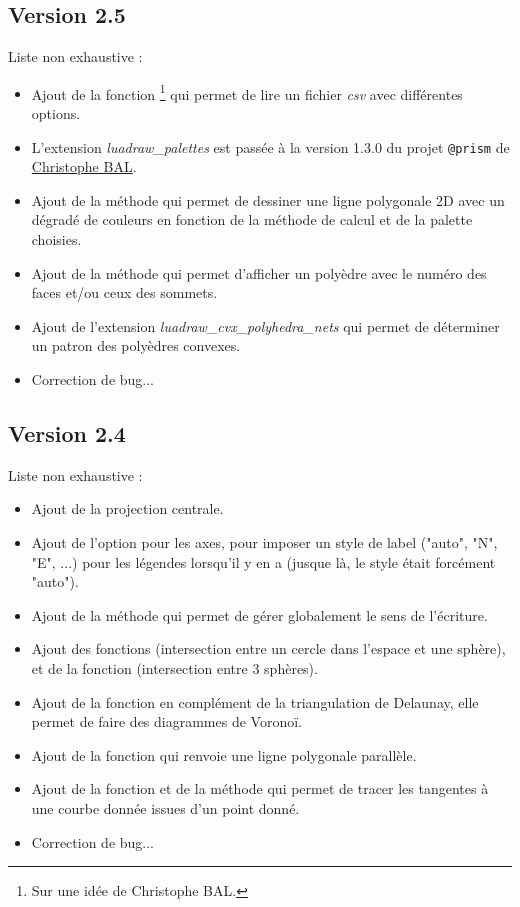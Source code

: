 \subsection{Version 2.5}
Liste non exhaustive :
\begin{itemize}
    \item Ajout de la fonction \footnote{Sur une idée de Christophe BAL.} qui permet de lire un fichier \emph{csv} avec différentes options.
    \item L'extension \emph{luadraw\_palettes} est passée à la version 1.3.0 du projet \verb|@prism| de \href{https://github.com/projetmbc/for-writing/tree/main/@prism}{Christophe BAL}.
    \item Ajout de la méthode  qui permet de dessiner une ligne polygonale 2D avec un dégradé de couleurs en fonction de la méthode de calcul et de la palette choisies.
    \item Ajout de la méthode  qui permet d'afficher un polyèdre avec le numéro des faces et/ou ceux des sommets.
    \item Ajout de l'extension \emph{luadraw\_cvx\_polyhedra\_nets} qui permet de déterminer un patron des polyèdres convexes.
    \item Correction de bug...
\end{itemize}

\subsection{Version 2.4}
Liste non exhaustive :
\begin{itemize}
    \item Ajout de la projection centrale.
    \item Ajout de l'option  pour les axes, pour imposer un style de label ("auto", "N", "E", ...) pour les légendes lorsqu'il y en a (jusque là, le style était forcément "auto"). 
    \item Ajout de la méthode  qui permet de gérer globalement le sens de l'écriture.
    \item Ajout des fonctions  (intersection entre un cercle dans l'espace et une sphère), et de la fonction  (intersection entre 3 sphères).
    \item Ajout de la fonction  en complément de la triangulation de Delaunay, elle permet de faire des diagrammes de Voronoï.
    \item Ajout de la fonction  qui renvoie une ligne polygonale parallèle.
    \item Ajout de la fonction  et de la méthode  qui permet de tracer les tangentes à une courbe donnée issues d'un point donné.
    \item Correction de bug...
\end{itemize}


